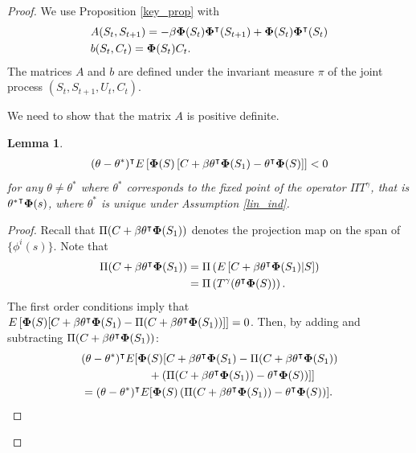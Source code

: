 \documentclass[10pt,a4paper]{amsart}
\newtheorem{lemma}{Lemma}
\begin{document}
\begin{proof}
We use Proposition \ref{key_prop} with 
\begin{align*}
&A(S_t,S_{t+1})= -\beta{\bf \Phi}(S_t){\bf \Phi}^\intercal(S_{t+1})+ {\bf \Phi}(S_t){\bf \Phi}^\intercal(S_{t})\\
&b(S_t,C_t)={\bf \Phi}(S_t)C_t.
\end{align*}
The matrices $A$ and $b$ are defined under the invariant measure $\pi$ of the  joint process $(S_t,S_{t+1},U_t,C_t)$. 
 
 We need to show that the matrix $A$ is positive definite. 
 
 \begin{lemma}\label{helpful_lem}
\begin{align*}
(\theta-\theta^*)^\intercal E\left[ {\bf \Phi}(S)\left[ C+\beta \theta^\intercal{\bf \Phi}(S_1) - \theta^\intercal{\bf \Phi}(S)\right] \right]<0
\end{align*}
for any $\theta\neq\theta^*$ where $\theta^*$ corresponds to the fixed point of the operator $\Pi T^\gamma$, that is ${\theta^*}^\intercal{\bf \Phi}(s)$, where $\theta^*$ is unique under Assumption \ref{lin_ind}. 
\end{lemma}
\begin{proof}
Recall that $\Pi(C+\beta \theta^\intercal{\bf \Phi}(S_1) )$ denotes the projection map on the span of $\{\phi^i(s)\}$. Note that
\begin{align*}
\Pi(C+\beta \theta^\intercal{\bf \Phi}(S_1) ) &= \Pi\left(E\left[C+\beta \theta^\intercal{\bf \Phi}(S_1) |S\right]\right)\\
&=\Pi\left( T^\gamma ( \theta^\intercal{\bf \Phi}(S) ) \right).
\end{align*}
The first order conditions imply that $E\left[{\bf \Phi}(S)[ C+\beta \theta^\intercal{\bf \Phi}(S_1)  - \Pi(C+\beta \theta^\intercal{\bf \Phi}(S_1) ) ] \right]=0$. Then,  by adding and subtracting $ \Pi(C+\beta \theta^\intercal{\bf \Phi}(S_1) )$:
\begin{align*}
&(\theta-\theta^*)^\intercal E[ {\bf \Phi}(S)[ C+\beta \theta^\intercal{\bf \Phi}(S_1)  - \Pi(C+\beta \theta^\intercal{\bf \Phi}(S_1) )  \\
&\qquad\qquad\qquad +\left(  \Pi(C+\beta \theta^\intercal{\bf \Phi}(S_1) )-\theta^\intercal{\bf \Phi}(S)\right)] ]\\
& = (\theta-\theta^*)^\intercal E[ {\bf \Phi}(S)\left(  \Pi(C+\beta \theta^\intercal{\bf \Phi}(S_1) )-\theta^\intercal{\bf \Phi}(S) \right)] .
\end{align*}



\end{proof}
\end{proof}
\end{document}
